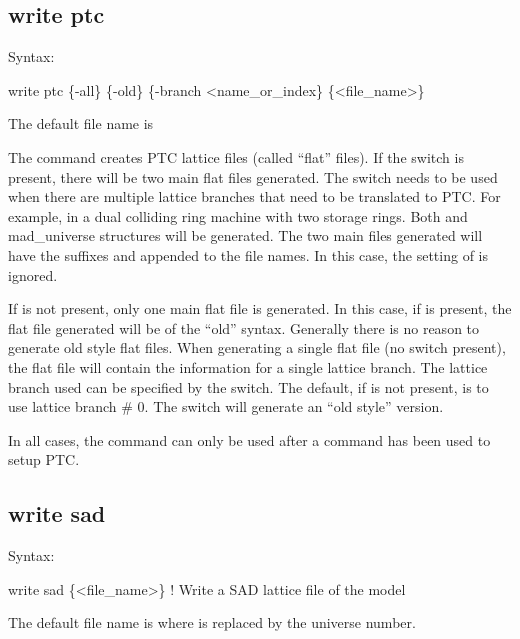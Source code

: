 {{{{{{{{{\subsection{write ptc}
\label{s:write.ptc}

Syntax:
\begin{example}
    write ptc \{-all\} \{-old\} \{-branch <name_or_index\} \{<file_name>\}
\end{example}

The default file name is 

The  command creates PTC lattice files (called ``flat'' files).  If the 
switch is present, there will be two main flat files generated. The  switch needs to be
used when there are multiple lattice branches that need to be translated to PTC. For example, in a
dual colliding ring machine with two storage rings.  Both  and  mad_universe
structures will be generated. The two main files generated will have the suffixes  and
 appended to the file names. In this case, the setting of  is ignored.

If  is not present, only one main flat file is generated. In this case, if  is
present, the flat file generated will be of the ``old'' syntax. Generally there is no reason to
generate old style flat files. When generating a single flat file (no  switch present), the
flat file will contain the information for a single lattice branch. The lattice branch used can be
specified by the  switch. The default, if  is not present, is to use lattice
branch \# 0. The  switch will generate an ``old style'' version.

In all cases, the  command can only be used after a  command
has been used to setup PTC.


\subsection{write sad}
\label{s:write.sad}

Syntax:
\begin{example}
    write sad \{<file_name>\}  ! Write a SAD lattice file of the model
\end{example}

The default file name is  where \vn{\#} is replaced by the universe number. 

}}}}}}}}}
